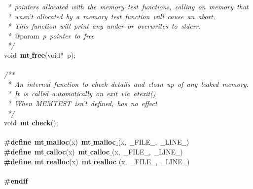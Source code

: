 \documentclass{article}
\begin{document}
\mbox{}\textit{\ *\ pointers\ allocated\ with\ the\ memory\ test\ functions,\ calling\ on\ memory\ that} \\
\mbox{}\textit{\ *\ wasn't\ allocated\ by\ a\ memory\ test\ function\ will\ cause\ an\ abort.} \\
\mbox{}\textit{\ *\ This\ function\ will\ print\ any\ under\ or\ overwrites\ to\ stderr.} \\
\mbox{}\textit{\ *\ }@param\textit{\ p\ pointer\ to\ free} \\
\mbox{}\textit{\ */} \\
\mbox{}void\ \textbf{mt$\_$free}(void*\ p); \\
\mbox{} \\
\mbox{}\textit{/**} \\
\mbox{}\textit{\ *\ An\ internal\ function\ to\ check\ details\ and\ clean\ up\ of\ any\ leaked\ memory.} \\
\mbox{}\textit{\ *\ It\ is\ called\ automatically\ on\ exit\ via\ atexit()} \\
\mbox{}\textit{\ *\ When\ MEMTEST\ isn't\ defined,\ has\ no\ effect} \\
\mbox{}\textit{\ */} \\
\mbox{}void\ \textbf{mt$\_$check}(); \\
\mbox{} \\
\mbox{}\textbf{\#define}\ \textbf{mt$\_$malloc}(x)\ \textbf{mt$\_$malloc$\_$}(x,\ $\_$$\_$FILE$\_$$\_$,\ $\_$$\_$LINE$\_$$\_$) \\
\mbox{}\textbf{\#define}\ \textbf{mt$\_$calloc}(x)\ \textbf{mt$\_$calloc$\_$}(x,\ $\_$$\_$FILE$\_$$\_$,\ $\_$$\_$LINE$\_$$\_$) \\
\mbox{}\textbf{\#define}\ \textbf{mt$\_$realloc}(x)\ \textbf{mt$\_$realloc$\_$}(x,\ $\_$$\_$FILE$\_$$\_$,\ $\_$$\_$LINE$\_$$\_$) \\
\mbox{} \\
\mbox{}\textbf{\#endif} \\
\mbox{}
\end{document}
